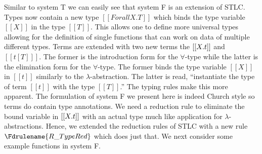 Similar to system T we can easily see that system F is an extension of
STLC.  Types now contain a new type $[[Forall X.T]]$ which binds the
type variable $[[X]]$ in the type $[[T]]$.  This allows one to define
more universal types allowing for the definition of single functions
that can work on data of multiple different types.  Terms are extended
with two new terms the $[[\\X.t]]$ and $[[t [T] ]]$.  The former is
the introduction form for the $\forall$-type while the latter is the
elimination form for the $\forall$-type. The former binds the type
variable $[[X]]$ in $[[t]]$ similarly to the
$\lambda$-abstraction. The latter is read, ``instantiate the type of
term $[[t]]$ with the type $[[T]]$.''  The typing rules make this more
apparent.  The formulation of system F we present here is indeed
Church style so terms do contain type annotations.  We need a
reduction rule to eliminate the bound variable in $[[\\X.t]]$ with an
actual type much like application for $\lambda$-abstractions.  Hence,
we extended the reduction rules of STLC with a new rule
$\Fdrulename{R\_TypeRed}$ which does just that.  We next consider some
example functions in system F.
